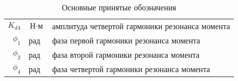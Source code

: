 \begin{table}[ht!]
\begin{tabular}{rll}
    $K_{d4}$             & $\text{Н} \cdot \text{м}$ & амплитуда четвертой гармоники резонанса момента \\

    $\phi_{1}$           & рад & фаза первой гармоники резонанса момента \\

    $\phi_{2}$           & рад & фаза второй гармоники резонанса момента \\

    $\phi_{4}$           & рад & фаза четвертой гармоники резонанса момента \\

    \end{tabular}
    \caption{ Основные принятые обозначения }
\end{table}
